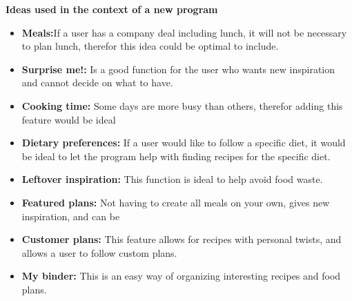 \textbf{Ideas used in the context of a new program}
\begin{itemize}
  \item \textbf{Meals:}If a user has a company deal including lunch, it will not be necessary to plan lunch, therefor this idea could be optimal to include.
  \item \textbf{Surprise me!:} Is a good function for the user who wants new inspiration and cannot decide on what to have.
  \item \textbf{Cooking time:} Some days are more busy than others, therefor adding this feature would be ideal
  \item \textbf{Dietary preferences:} If a user would like to follow a specific diet, it would be ideal to let the program help with finding recipes for the specific diet.
  \item \textbf{Leftover inspiration:} This function is ideal to help avoid food waste.
  \item \textbf{Featured plans:} Not having to create all meals on your own, gives new inspiration, and can be 
  \item \textbf{Customer plans:} This feature allows for recipes with personal twists, and allows a user to follow custom plans.
  \item \textbf{My binder:} This is an easy way of organizing interesting recipes and food plans. 
\end{itemize}
